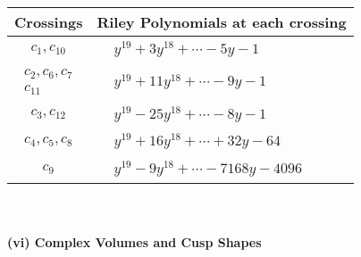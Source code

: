 \documentclass[1p]{elsarticle_modified}
\theoremstyle{definition}
\begin{document}
\begin{tabular}{m{50pt}|m{274pt}}
Crossings & \hspace{64pt}Riley Polynomials at each crossing \\
\hline $$\begin{aligned}c_{1},c_{10}\end{aligned}$$&$\begin{aligned}
&y^{19}+3 y^{18}+\cdots-5 y-1
\end{aligned}$\\
\hline $$\begin{aligned}c_{2},c_{6},c_{7}\\c_{11}\end{aligned}$$&$\begin{aligned}
&y^{19}+11 y^{18}+\cdots-9 y-1
\end{aligned}$\\
\hline $$\begin{aligned}c_{3},c_{12}\end{aligned}$$&$\begin{aligned}
&y^{19}-25 y^{18}+\cdots-8 y-1
\end{aligned}$\\
\hline $$\begin{aligned}c_{4},c_{5},c_{8}\end{aligned}$$&$\begin{aligned}
&y^{19}+16 y^{18}+\cdots+32 y-64
\end{aligned}$\\
\hline $$\begin{aligned}c_{9}\end{aligned}$$&$\begin{aligned}
&y^{19}-9 y^{18}+\cdots-7168 y-4096
\end{aligned}$\\
\hline
\end{tabular}\\~\\
\newpage\flushleft \textbf{(vi) Complex Volumes and Cusp Shapes}
\end{document}
